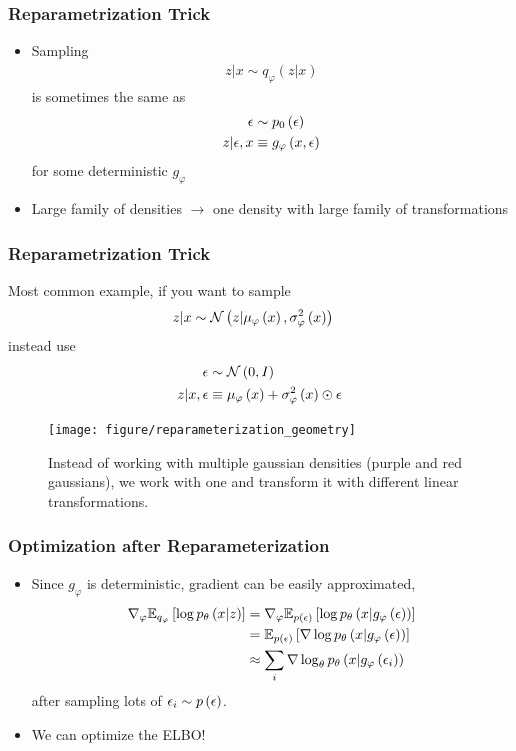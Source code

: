 \documentclass[10pt,mathserif]{beamer}
\begin{document}
\begin{frame}
  \frametitle{Reparametrization Trick}
  \begin{itemize}
  \item Sampling
  \begin{align*}
    z \vert x \sim q_{\varphi}\left(z \vert x\right)
  \end{align*}
  is sometimes the same as
  \begin{align*}
    \epsilon &\sim p_{0}\left(\epsilon\right) \\
    z \vert \epsilon, x &\equiv g_{\varphi}\left(x, \epsilon\right)
  \end{align*}
  for some deterministic $g_{\varphi}$
  \item Large family of densities $\rightarrow$ one density with large family of
    transformations
  \end{itemize}
\end{frame}

\begin{frame}
  \frametitle{Reparametrization Trick}
  Most common example, if you want to sample
  \begin{align*}
    z \vert x &\sim \mathcal{N}\left(z \vert \mu_{\varphi}\left(x\right), \sigma_{\varphi}^{2}\left(x\right)\right)
  \end{align*}
  instead use
  \begin{align*}
    \epsilon &\sim \mathcal{N}\left(0, I\right) \\
    z \vert x, \epsilon &\equiv \mu_{\varphi}\left(x\right) + \sigma_{\varphi}^{2}\left(x\right) \odot \epsilon
  \end{align*}
\begin{figure}[ht]
  \centering
  \texttt{[image: figure/reparameterization\_geometry]}
  \caption{Instead of working with multiple gaussian densities (purple and red
    gaussians), we work with one and transform it with different linear
    transformations. \label{fig:reparameterization_geometry} }
\end{figure}

\end{frame}

\begin{frame}
  \frametitle{Optimization after Reparameterization}
  \begin{itemize}
  \item Since $g_{\varphi}$ is deterministic, gradient can be easily
    approximated,
  \begin{align*}
    \nabla_{\varphi} \mathbb{E}_{q_{\varphi}}\left[{\log p_{\theta}\left(x \vert z\right)}\right] &=
    \nabla_{\varphi} \mathbb{E}_{p\left(\epsilon\right)}\left[{\log p_{\theta}\left(x \vert g_{\varphi}\left(\epsilon\right)\right)}\right] \\
    &= \mathbb{E}_{p\left(\epsilon\right)}\left[{\nabla \log p_{\theta}\left(x \vert g_{\varphi}\left(\epsilon\right)\right)}\right] \\
      &\approx \sum_{i} \nabla \log_{\theta}p_{\theta}\left(x \vert g_{\varphi}\left(\epsilon_{i}\right)\right)
  \end{align*}
  after sampling lots of $\epsilon_{i} \sim p\left(\epsilon\right)$.
  \item We can optimize the ELBO!
  \end{itemize}
\end{frame}
\end{document}
